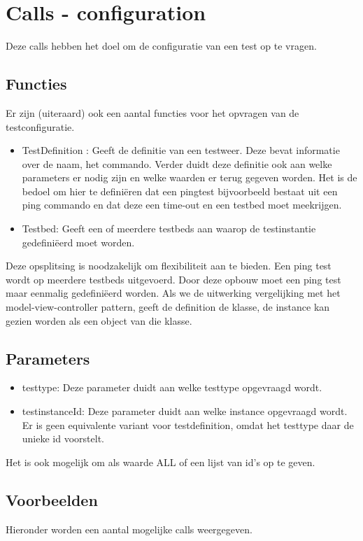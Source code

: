 \section{Calls - configuration}
Deze calls hebben het doel om de configuratie van een test op te vragen.

\subsection{Functies}
Er zijn (uiteraard) ook een aantal functies voor het opvragen van de testconfiguratie.
\begin{itemize}
\item TestDefinition : Geeft de definitie van een testweer. Deze bevat informatie over de naam, het commando. Verder duidt deze definitie ook aan welke parameters er nodig zijn en welke waarden er terug gegeven worden. Het is de bedoel om hier te defini\"eren dat een pingtest bijvoorbeeld bestaat uit een ping commando en dat deze een time-out en een testbed moet meekrijgen. 
\item Testbed: Geeft een of meerdere testbeds aan waarop de testinstantie gedefini\"eerd moet worden.
\end{itemize}

Deze opsplitsing is noodzakelijk om flexibiliteit aan te bieden. 
Een ping test wordt op meerdere testbeds uitgevoerd. Door deze opbouw moet een ping test maar eenmalig gedefini\"eerd worden. Als we de uitwerking vergelijking met het model-view-controller pattern, geeft de definition de klasse, de instance kan gezien worden als een object van die klasse.

\subsection{Parameters}

\begin{itemize}
\item testtype: Deze parameter duidt aan welke testtype opgevraagd wordt.
\item testinstanceId: Deze parameter duidt aan welke instance opgevraagd wordt. Er is geen equivalente variant voor testdefinition, omdat het testtype daar de unieke id voorstelt.
\end{itemize}
Het is ook mogelijk om als waarde ALL of een lijst van id's op te geven.

\subsection{Voorbeelden}
Hieronder worden een aantal mogelijke calls weergegeven. 

